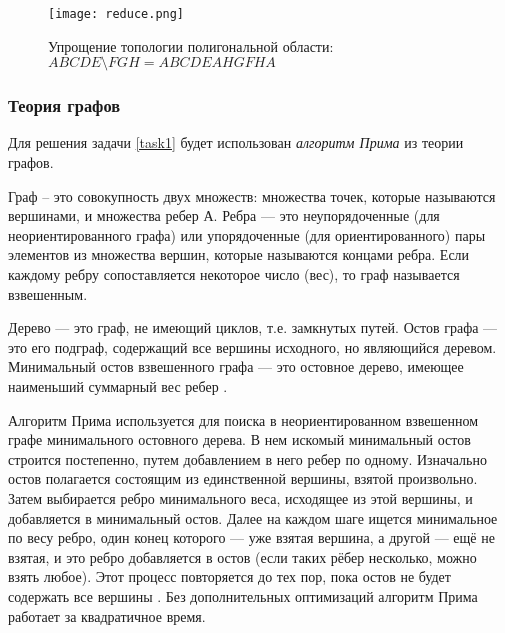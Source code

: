 \begin{figure}[ht]
    \centering
    \texttt{[image: reduce.png]}
    \caption{Упрощение топологии полигональной области: $ABCDE \setminus FGH = ABCDEAHGFHA$}
    \label{fig:polysimp}
\end{figure}

\subsubsection{Теория графов}
\label{}

Для решения задачи \ref{task1} будет использован \textit{алгоритм Прима} из теории графов.

Граф – это совокупность двух множеств: множества точек, которые называются вершинами, и множества ребер А. Ребра --- это неупорядоченные (для неориентированного графа) или упорядоченные (для ориентированного) пары элементов из множества вершин, которые называются концами ребра. Если каждому ребру сопоставляется некоторое число (вес), то граф называется взвешенным. 

Дерево --- это граф, не имеющий циклов, т.е. замкнутых путей. Остов графа --- это его подграф, содержащий все вершины исходного, но являющийся деревом. Минимальный остов взвешенного графа --- это остовное дерево, имеющее наименьший суммарный вес ребер \cite{__2010}.

Алгоритм Прима используется для поиска в неориентированном взвешенном графе минимального остовного дерева. В нем искомый минимальный остов строится постепенно, путем добавлением в него ребер по одному. Изначально остов полагается состоящим из единственной вершины, взятой произвольно. Затем выбирается ребро минимального веса, исходящее из этой вершины, и добавляется в минимальный остов. Далее на каждом шаге ищется минимальное по весу ребро, один конец которого — уже взятая вершина, а другой — ещё не взятая, и это ребро добавляется в остов (если таких рёбер несколько, можно взять любое). Этот процесс повторяется до тех пор, пока остов не будет содержать все вершины \cite{prim_shortest_1957}. Без дополнительных оптимизаций алгоритм Прима работает за квадратичное время.